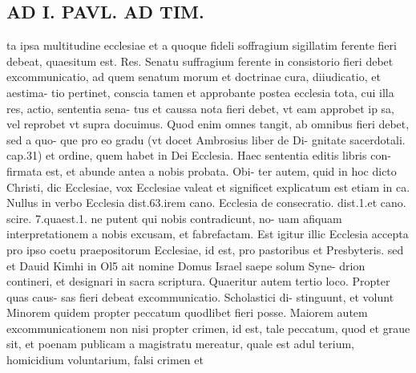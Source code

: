 \documentclass{article}
\begin{document}
\begin{pages}
\section*{AD I. PAVL. AD TIM. }
\marginpar{[ p.334 ]}\pstart ta ipsa multitudine ecclesiae et a quoque fideli soffragium sigillatim ferente fieri debeat, quaesitum est. Res. Senatu suffragium ferente in consistorio fieri debet excommunicatio, ad quem senatum morum et doctrinae cura, diiudicatio, et aestima- tio pertinet, conscia tamen et approbante postea ecclesia tota, cui illa res, actio, sententia sena- tus et caussa nota fieri debet, vt eam approbet ip sa, vel reprobet vt supra docuimus. Quod enim omnes tangit, ab omnibus fieri debet, sed a quo- que pro eo gradu (vt docet Ambrosius liber  de Di- gnitate sacerdotali. cap.31) et ordine, quem habet in Dei Ecclesia. Haec sententia editis libris con- firmata est, et abunde antea a nobis probata. Obi- ter autem, quid in hoc dicto Christi, dic Ecclesiae, vox Ecclesiae valeat et significet explicatum est etiam in ca. Nullus in verbo Ecclesia dist.63.irem cano. Ecclesia de consecratio. dist.1.et cano. scire. 7.quaest.1. ne putent qui nobis contradicunt, no- uam afiquam interpretationem a nobis excusam, et fabrefactam. Est igitur illic Ecclesia accepta pro ipso coetu praepositorum Ecclesiae, id est, pro pastoribus et Presbyteris. sed et Dauid Kimhi in Ol5 ait nomine Domus Israel saepe solum Syne- drion contineri, et designari in sacra scriptura.  \pend\pstart Quaeritur autem tertio loco. Propter quas caus- sas fieri debeat excommunicatio. Scholastici di- stinguunt, et volunt Minorem quidem propter peccatum quodlibet fieri posse. Maiorem autem excommunicationem non nisi propter crimen, id est, tale peccatum, quod et graue sit, et poenam publicam a magistratu mereatur, quale est adul terium, homicidium voluntarium, falsi crimen et  \pend

\end{pages}
\end{document}
